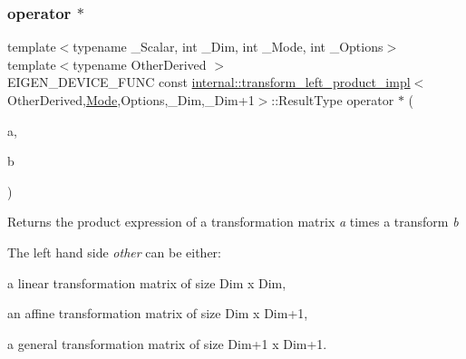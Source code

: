 \subsubsection{\texorpdfstring{operator $\ast$}{operator *}\hspace{0.1cm}{\footnotesize\ttfamily [1/2]}}
{\footnotesize\ttfamily template$<$typename \+\_\+\+Scalar, int \+\_\+\+Dim, int \+\_\+\+Mode, int \+\_\+\+Options$>$ \\
template$<$typename Other\+Derived $>$ \\
E\+I\+G\+E\+N\+\_\+\+D\+E\+V\+I\+C\+E\+\_\+\+F\+U\+NC const \mbox{\hyperlink{struct_eigen_1_1internal_1_1transform__left__product__impl}{internal\+::transform\+\_\+left\+\_\+product\+\_\+impl}}$<$Other\+Derived,\mbox{\hyperlink{struct_mode}{Mode}},Options,\+\_\+\+Dim,\+\_\+\+Dim+1$>$\+::Result\+Type operator $\ast$ (\begin{DoxyParamCaption}\item[{const \mbox{\hyperlink{struct_eigen_1_1_eigen_base}{Eigen\+Base}}$<$ Other\+Derived $>$ \&}]{a,  }\item[{const \mbox{\hyperlink{class_eigen_1_1_transform}{Transform}}$<$ \+\_\+\+Scalar, \+\_\+\+Dim, \+\_\+\+Mode, \+\_\+\+Options $>$ \&}]{b }\end{DoxyParamCaption})\hspace{0.3cm}{\ttfamily [friend]}}

\begin{DoxyReturn}{Returns}
the product expression of a transformation matrix {\itshape a} times a transform {\itshape b} 
\end{DoxyReturn}
The left hand side {\itshape other} can be either\+: \begin{DoxyItemize}
\item a linear transformation matrix of size Dim x Dim, \item an affine transformation matrix of size Dim x Dim+1, \item a general transformation matrix of size Dim+1 x Dim+1. \end{DoxyItemize}
\mbox{\label{class_eigen_1_1_transform_a0410573ad8301138a2ff17fbe73fb13d}} 
